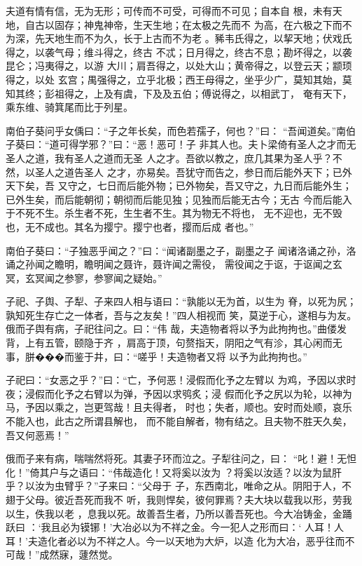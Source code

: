 \documentclass[12pt,UTF8]{ctexbook}
\begin{document}
夫道有情有信，无为无形；可传而不可受，可得而不可见；自本自 根，未有天地，自古以固存；神鬼神帝，生天生地；在太极之先而不 为高，在六极之下而不为深，先天地生而不为久，长于上古而不为老 。豨韦氏得之，以挈天地；伏戏氏得之，以袭气母；维斗得之，终古 不忒；日月得之，终古不息；勘坏得之，以袭昆仑；冯夷得之，以游 大川；肩吾得之，以处大山；黄帝得之，以登云天；颛顼得之，以处 玄宫；禺强得之，立乎北极；西王母得之，坐乎少广，莫知其始，莫 知其终；彭祖得之，上及有虞，下及及五伯；傅说得之，以相武丁， 奄有天下，乘东维、骑箕尾而比于列星。

南伯子葵问乎女偊曰：“子之年长矣，而色若孺子，何也？”曰： “吾闻道矣。”南伯子葵曰：“道可得学邪？”曰：“恶！恶可！子 非其人也。夫卜梁倚有圣人之才而无圣人之道，我有圣人之道而无圣 人之才。吾欲以教之，庶几其果为圣人乎？不然，以圣人之道告圣人 之才，亦易矣。吾犹守而告之，参日而后能外天下；已外天下矣，吾 又守之，七日而后能外物；已外物矣，吾又守之，九日而后能外生； 已外生矣，而后能朝彻；朝彻而后能见独；见独而后能无古今；无古 今而后能入于不死不生。杀生者不死，生生者不生。其为物无不将也， 无不迎也，无不毁也，无不成也。其名为撄宁。撄宁也者，撄而后成 者也。”

南伯子葵曰：“子独恶乎闻之？”曰：“闻诸副墨之子，副墨之子 闻诸洛诵之孙，洛诵之孙闻之瞻明，瞻明闻之聂许，聂许闻之需役， 需役闻之于讴，于讴闻之玄冥，玄冥闻之参寥，参寥闻之疑始。”

子祀、子舆、子犁、子来四人相与语曰：“孰能以无为首，以生为 脊，以死为尻；孰知死生存亡之一体者，吾与之友矣！”四人相视而 笑，莫逆于心，遂相与为友。俄而子舆有病，子祀往问之。曰：“伟 哉，夫造物者将以予为此拘拘也。”曲偻发背，上有五管，颐隐于齐 ，肩高于顶，句赘指天，阴阳之气有沴，其心闲而无事，胼���而鉴于井，曰：“嗟乎！夫造物者又将 以予为此拘拘也。”

子祀曰：“女恶之乎？”曰：“亡，予何恶！浸假而化予之左臂以 为鸡，予因以求时夜；浸假而化予之右臂以为弹，予因以求鸮炙；浸 假而化予之尻以为轮，以神为马，予因以乘之，岂更驾哉！且夫得者， 时也；失者，顺也。安时而处顺，哀乐不能入也，此古之所谓县解也， 而不能自解者，物有结之。且夫物不胜天久矣，吾又何恶焉！”

俄而子来有病，喘喘然将死。其妻子环而泣之。子犁往问之，曰： “叱！避！无怛化！”倚其户与之语曰：“伟哉造化！又将奚以汝为 ？将奚以汝适？以汝为鼠肝乎？以汝为虫臂乎？”子来曰：“父母于 子，东西南北，唯命之从。阴阳于人，不翅于父母。彼近吾死而我不 听，我则悍矣，彼何罪焉？夫大块以载我以形，劳我以生，佚我以老 ，息我以死。故善吾生者，乃所以善吾死也。今大冶铸金，金踊跃曰 ：‘我且必为镆铘！’大冶必以为不祥之金。今一犯人之形而曰：‘ 人耳！人耳！’夫造化者必以为不祥之人。今一以天地为大炉，以造 化为大冶，恶乎往而不可哉！”成然寐，蘧然觉。
\end{document}
